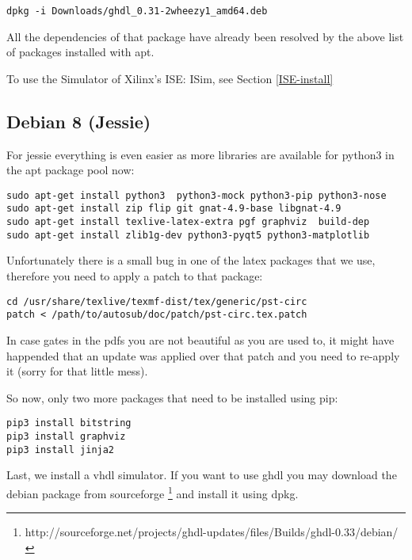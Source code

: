 \begin{verbatim}
dpkg -i Downloads/ghdl_0.31-2wheezy1_amd64.deb
\end{verbatim}

All the dependencies of that package have already been resolved by the above
list of packages installed with apt.

To use the Simulator of Xilinx's ISE: ISim, see Section \ref{ISE-install}


\subsection{Debian 8 (Jessie)}

For jessie everything is even easier as more libraries are available for python3 in the
apt package pool now:

\begin{verbatim}
sudo apt-get install python3  python3-mock python3-pip python3-nose
sudo apt-get install zip flip git gnat-4.9-base libgnat-4.9
sudo apt-get install texlive-latex-extra pgf graphviz  build-dep
sudo apt-get install zlib1g-dev python3-pyqt5 python3-matplotlib  
\end{verbatim}

Unfortunately there is a small bug in one of the latex packages that we use,
therefore you need to apply a patch to that package:

\begin{verbatim}
cd /usr/share/texlive/texmf-dist/tex/generic/pst-circ
patch < /path/to/autosub/doc/patch/pst-circ.tex.patch
\end{verbatim}

In case gates in the pdfs you are not beautiful as you are used to, it might have
happended that an update was applied over that patch and you need to re-apply it (sorry for that little mess).

So now, only two more packages that need to be installed using pip:

\begin{verbatim}
pip3 install bitstring
pip3 install graphviz
pip3 install jinja2
\end{verbatim}

Last, we install a vhdl simulator. If you want to use ghdl you may download
the debian package from sourceforge \footnote{http://sourceforge.net/projects/ghdl-updates/files/Builds/ghdl-0.33/debian/}
and install it using dpkg.

